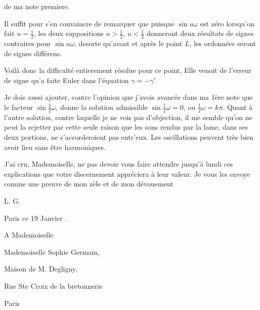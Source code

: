 \documentclass[11pt,a4paper]{article}
\begin{document}

de ma note premiere.

Il suffit pour s'en convaincre de remarquer que puisque $\sin u\omega$ est
zéro lorsqu'on fait $u = \frac{1}{2}$, les deux suppositions \struck{\ill{}}
$u > \frac{1}{2}$, $u < \frac{1}{2}$ donneront deux résultats de signes
contraires pour $\sin u\omega$, desorte qu'avant et après le point $L$, les
ordonnées seront de signes différens.

Voilà donc la difficulté entierement résolue pour ce point, Elle venoit de
l'erreur de signe qu'a faite Euler dans l'équation $\gamma = -\gamma'$

Je dois aussi ajouter, contre l'opinion que j'avois avancée dans ma 1ère
note que le facteur $\sin \frac{1}{2}\omega$, donne la solution admissible
$\sin \frac{1}{2}\omega = 0$, ou $\frac{1}{2}\omega = k\pi$. Quant à l'autre
solution, contre laquelle je ne vois pas d'objection, il me semble qu'on ne
peut la rejetter par cette seule raison que les sons rendus par la lame, dans
ses deux portions, ne s'accorderoient pas entr'eux. Les oscillations peuvent
très bien avoir lieu sans être harmoniques.

J'ai cru, Mademoiselle, ne pas devoir vous faire attendre jusqu'à lundi ces
explications que votre discernement appréciera à leur valeur. Je vous les
envoye comme une preuve de mon zèle et de mon dévouement

L. G.

Paris ce 19 Janvier .


A Mademoiselle

Mademoiselle Sophie Germain,

Maison de M. Degligny,

Rue Ste Croix de la bretonnerie

Paris

\end{document}
